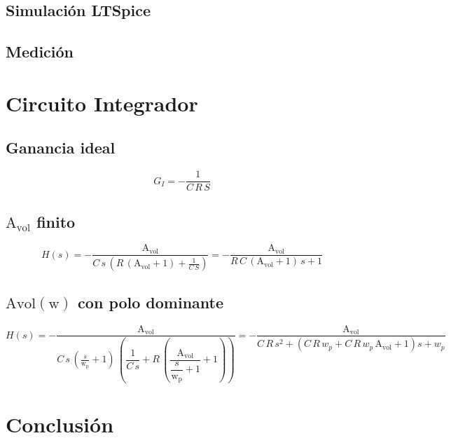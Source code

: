 \documentclass[11pt, a4paper]{article}
\begin{document}
\subsection{Simulación LTSpice}

\subsection{Medición}

\section{Circuito Integrador}

\subsection{Ganancia ideal}
\begin{equation}
G_I=-\dfrac{1}{C\,R\,S}
\end{equation}

\subsection{$\mathrm{A_{vol}}$ finito}
\begin{equation}
H(s)=- \dfrac{\mathrm{A_{vol}}}{C\,s\,\left(R\,\left(\mathrm{A_{vol}}+1 \right) + \frac{1}{C\,S}\right)} = -\dfrac{\mathrm{A_{vol}}}{R\,C\,\left( \mathrm{A_{vol}} + 1 \right)\,s + 1}
\end{equation}

\subsection{$\mathrm{A{vol}(w)}$ con polo dominante}
\begin{equation}
H(s)= -\frac{\mathrm{A_{vol}}}{C\,s\,\left(\frac{s}{\mathrm{w_p}}+1\right)\,\left(\dfrac{1}{C\,s}+R\,\left(\dfrac{\mathrm{A_{vol}}}{\dfrac{s}{\mathrm{w_p}}+1}+1\right)\right)}
= - \dfrac{\mathrm{A_{vol}}}{C\,R\,s^2+(C\,R\,w_p+C\,R\,w_p\,\mathrm{A_{vol}}+1)s+w_p}
\end{equation}



\section{Conclusión}
\end{document}
